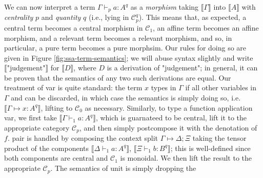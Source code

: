 \documentclass[acmsmall,screen,review]{acmart}
\newcommand{\mc}[1]{\ensuremath{\mathcal{#1}}}
\newcommand{\ms}[1]{\ensuremath{\mathsf{#1}}}
\newcommand{\csplits}[3]{#1 \mapsto #2;#3}
\newcommand{\cwk}[2]{#1 \mapsto #2}
\newcommand{\lwk}[2]{#1 \rightsquigarrow #2}
\newcommand{\thyp}[3]{#1: {#2}^{#3}}
\newcommand{\rle}[1]{{\scriptsize\textsf{#1}}}
\newcommand{\hasty}[5]{#1 \vdash_{#2} #3: {#4}^{#5}}
\newcommand{\haslb}[3]{#1 \vdash #2 \rhd #3}
\newcommand{\dnt}[1]{\llbracket{#1}\rrbracket}
\begin{document}
We can now interpret a term \(\hasty{\Gamma}{p}{a}{A}{q}\) as a
\textit{morphism} taking \(\dnt{\Gamma}\) into \(\dnt{A}\) with
\textit{centrality} \(p\) and \textit{quantity} \(q\) (i.e., lying in
\(\mc{C}_p^q\)). This means that, as expected, a central term becomes a central
morphism in \(\mc{C}_1\), an affine term becomes an affine morphism, and a
relevant term becomes a relevant morphism, and so, in particular, a pure term
becomes a pure morphsim. Our rules for doing so are given in Figure
\ref{fig:ssa-term-semantics}; we will abuse syntax slightly and write
\(\dnt{\text{"judgement"}}\) for \(\dnt{D}\), where \(D\) is a derivation of
"judgement"; in general, it can be proven that the semantics of any two such
derivations are equal.
Our treatment of \rle{var} is quite standard: the term \(x\) types in \(\Gamma\)
if all other variables in \(\Gamma\) and can be discarded, in which case the
semantics is simply doing so, i.e. \(\dnt{\cwk{\Gamma}{\thyp{x}{A}{q}}}\),
lifting to \(\mc{C}_0\) as necessary. Similarly, to type a function application
\rle{var}, we first take \(\dnt{\hasty{\Gamma}{1}{a}{A}{q}}\), which is
guarnateed to be central, lift it to the appropriate category \(\mc{C}_p\), and
then simply postcompose it with the denotation of \(f\). \rle{pair} is handled
by composing the context split \(\csplits{\Gamma}{\Delta}{\Xi}\) taking the
tensor product of the components \(\dnt{\hasty{\Delta}{1}{a}{A}{q}}\),
\(\dnt{\hasty{\Xi}{1}{b}{B}{q}}\); this is well-defined since both components
are central and \(\mc{C}_1\) is monoidal. We then lift the result to the
appropriate \(\mc{C}_p\). The semantics of \rle{unit} is simply dropping the
\end{document}
